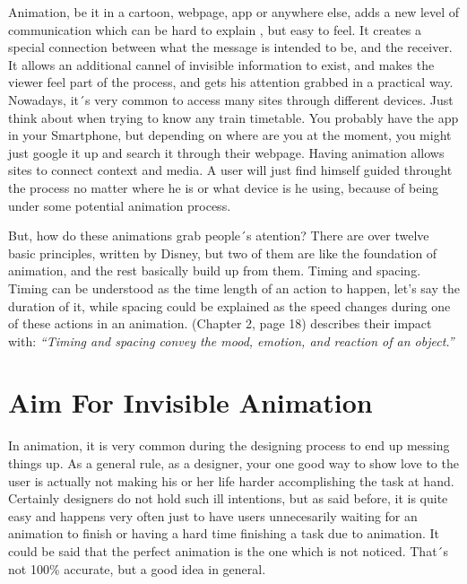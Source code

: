 Animation, be it in a cartoon, webpage, app or anywhere else, adds a new level of communication which can be hard to explain , but easy to feel. It creates a special connection between what the message is intended to be, and the receiver. It allows an additional cannel of invisible information to exist, and makes the viewer feel part of the process, and gets his attention grabbed in a practical way. Nowadays, it´s very common to access many sites through different devices. Just think about when trying to know any train timetable. You probably have the app in your Smartphone, but depending on where are you at the moment, you might just google it up and search it through their webpage. Having animation allows sites to connect context and media. A user will just find himself guided throught the process no matter where he is or what device is he using, because of being under some potential animation process. 

But, how do these animations grab people´s atention? There are over twelve basic principles, written by Disney, but two of them are like the foundation of animation, and the rest basically build up from them. Timing and spacing. Timing can be understood as the time length of an action to happen, let’s say the duration of it, while spacing could be explained as the speed changes during one of these actions in an animation. 
\citet{head2016designing} (Chapter 2, page 18) describes their impact with: {\em“Timing and spacing convey the mood, emotion, and reaction of an object.”}


\section{Aim For Invisible Animation} %
\label{sec:anime_invisible}

In animation, it is very common during the designing process to end up messing things up. As a general rule, as a designer, your one good way to show love to the user is actually not making his or her life harder accomplishing the task at hand. Certainly designers do not hold such ill intentions, but as said before, it is quite easy and happens very often just to have users unnecesarily waiting for an animation to finish or having a hard time finishing a task due to animation. It could be said that the perfect animation is the one which is not noticed. That´s not 100\% accurate, but a good idea in general. 

